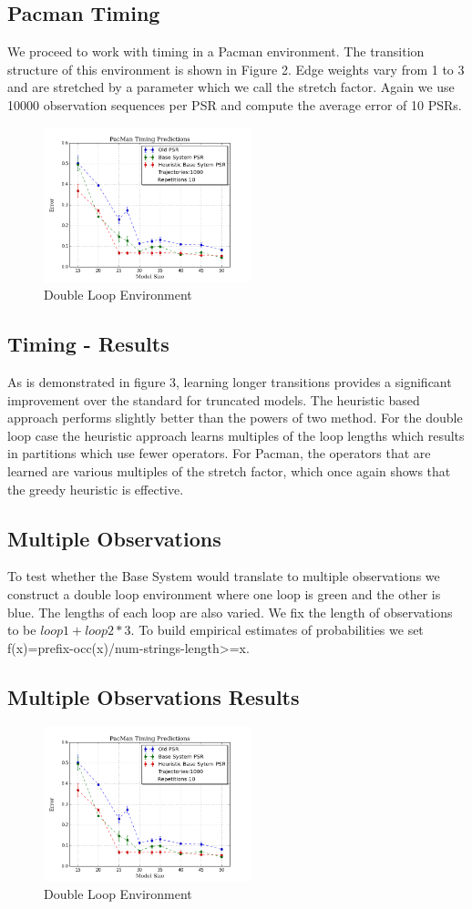 \subsection{Pacman Timing}

We proceed to work with timing in a Pacman environment. The transition structure of this environment is shown in Figure 2. Edge weights vary from 1 to 3 and are stretched by a parameter which we call the stretch factor. Again we use 10000 observation sequences per PSR and compute the average error of 10 PSRs.

\begin{figure}[ht!]
\centering
\includegraphics[width=60mm]{uCOREPICS/PacManTimingHeuristicsIncluded.png}
\caption{Double Loop Environment\label{overflow}}
\end{figure}

\subsection{Timing - Results}
As is demonstrated in figure 3, learning longer transitions provides a significant improvement over the standard for truncated models. The heuristic based approach performs slightly better than the powers of two method. For the double loop case the heuristic approach learns multiples of the loop lengths which results in partitions which use fewer operators. For Pacman, the operators that are learned are various multiples of the stretch factor, which once again shows that the greedy heuristic is effective. 

\subsection{Multiple Observations}

To test whether the Base System would translate to multiple observations we construct a double loop environment where one loop is green and the other is blue. The lengths of each loop are also varied. We fix the length of observations to be $loop1 + loop2 * 3$. To build empirical estimates of probabilities we set f(x)=prefix-occ(x)/num-strings-length>=x.

\subsection{Multiple Observations Results}

\begin{figure}[ht!]
\centering
\includegraphics[width=60mm]{uCOREPICS/PacManTimingHeuristicsIncluded.png}
\caption{Double Loop Environment\label{overflow}}
\end{figure}
